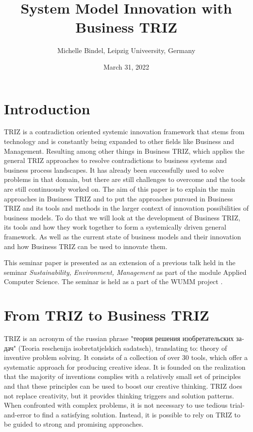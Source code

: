 \documentclass[11pt,a4paper]{article}
\title{System Model Innovation with Business TRIZ}
\author{Michelle Bindel, Leipzig Univeersity, Germany}
\date{March 31, 2022}
\begin{document}
\maketitle
\tableofcontents

\section{Introduction}

TRIZ is a contradiction oriented systemic innovation framework that stems from
technology and is constantly being expanded to other fields like Business and
Management. Resulting among other things in Business TRIZ, which applies the
general TRIZ approaches to resolve contradictions to business systems and
business process landscapes. It has already been successfully used to solve
problems in that domain, but there are still challenges to overcome and the
tools are still continuously worked on. The aim of this paper is to explain
the main approaches in Business TRIZ and to put the approaches pursued in
Business TRIZ and its tools and methods in the larger context of innovation
possibilities of business models.  To do that we will look at the development
of Business TRIZ, its tools and how they work together to form a systemically
driven general framework. As well as the current state of business models and
their innovation and how Business TRIZ can be used to innovate them. 

This seminar paper is presented as an extension of a previous talk held in the
seminar \emph{Sustainability, Environment, Management} as part of the module
Applied Computer Science. The seminar is held as a part of the WUMM project
\cite{1}.

\section{From TRIZ to Business TRIZ}

TRIZ is an acronym of the russian phrase "\foreignlanguage{russian}{теория
  решения изобретательских задач}" (Teoria reschenija isobretatjelskich
sadatsch), translating to: theory of inventive problem solving. It consists of
a collection of over 30 tools, which offer a systematic approach for producing
creative ideas. It is founded on the realization that the majority of
inventions complies with a relatively small set of principles and that these
principles can be used to boost our creative thinking. TRIZ does not replace
creativity, but it provides thinking triggers and solution patterns. When
confronted with complex problems, it is not necessary to use tedious
trial-and-error to find a satisfying solution. Instead, it is possible to rely
on TRIZ to be guided to strong and promising approaches. \cite{2}
\end{document}
